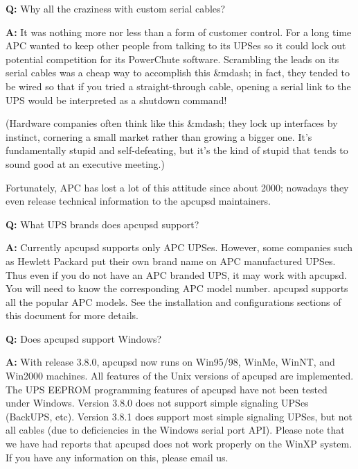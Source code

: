 \begin{description}

\item {\bf 
\label{crazy}
Q:}
Why all the craziness with custom serial cables?  

\item {\bf A:}
It was nothing more nor less than a form of customer control. For a long time
APC wanted to keep other people from talking to its UPSes so it could lock out
potential competition for its PowerChute software.  Scrambling the leads on
its serial cables was a cheap way to accomplish this \&mdash; in fact, they
tended to be wired so that if you tried a straight-through cable, opening a
serial link to the UPS would be interpreted as a shutdown command!  

(Hardware companies often think like this \&mdash; they lock up interfaces by
instinct, cornering a small market rather than growing a bigger one.  It's
fundamentally stupid and self-defeating, but it's the kind of stupid that
tends to sound good at an executive meeting.)  

Fortunately, APC has lost a lot of this attitude since about 2000; nowadays
they even release technical information to the apcupsd maintainers.  

\item {\bf Q:}
What UPS brands does apcupsd support?  

\item {\bf A:}
Currently apcupsd supports only APC UPSes. However, some companies such as
Hewlett Packard put their own brand name on APC manufactured UPSes. Thus even
if you do not have an APC branded UPS, it may work with apcupsd. You will need
to know the corresponding APC model number. apcupsd supports all the popular
APC models. See the installation and configurations sections of this document
for more details.  

\item {\bf Q:}
Does apcupsd support Windows?  

\item {\bf A:}
With release 3.8.0, apcupsd now runs on Win95/98, WinMe, WinNT, and Win2000
machines. All features of the Unix versions of apcupsd are implemented. The
UPS EEPROM programming features of apcupsd have not been tested under Windows.
Version 3.8.0 does not support simple signaling UPSes (BackUPS, etc). Version
3.8.1 does support most simple signaling UPSes, but not all cables (due to
deficiencies in the Windows serial port API). Please note that we have had
reports that apcupsd does not work properly on the WinXP system. If you have
any information on this, please email us.  


\end{description}

